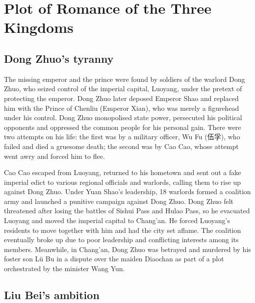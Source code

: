 
\chapter{Plot of Romance of the Three Kingdoms}

\section{Dong Zhuo's tyranny}
\label{sec:Dong Zhuo}

The missing emperor and the prince were found by soldiers of the warlord Dong Zhuo, who seized control of the imperial capital, Luoyang, under the pretext of protecting the emperor. Dong Zhuo later deposed Emperor Shao and replaced him with the Prince of Chenliu (Emperor Xian), who was merely a figurehead under his control. Dong Zhuo monopolised state power, persecuted his political opponents and oppressed the common people for his personal gain. There were two attempts on his life: the first was by a military officer, Wu Fu (伍孚), who failed and died a gruesome death; the second was by Cao Cao, whose attempt went awry and forced him to flee.

Cao Cao escaped from Luoyang, returned to his hometown and sent out a fake imperial edict to various regional officials and warlords, calling them to rise up against Dong Zhuo. Under Yuan Shao's leadership, 18 warlords formed a coalition army and launched a punitive campaign against Dong Zhuo. Dong Zhuo felt threatened after losing the battles of Sishui Pass and Hulao Pass, so he evacuated Luoyang and moved the imperial capital to Chang'an. He forced Luoyang's residents to move together with him and had the city set aflame. The coalition eventually broke up due to poor leadership and conflicting interests among its members. Meanwhile, in Chang'an, Dong Zhuo was betrayed and murdered by his foster son Lü Bu in a dispute over the maiden Diaochan as part of a plot orchestrated by the minister Wang Yun.

\section{Liu Bei's ambition}
\label{sec:Liu Bei}

